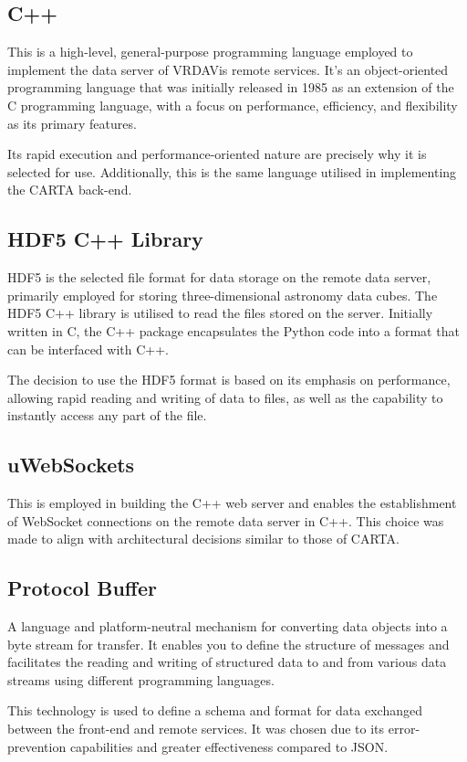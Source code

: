 \subsection{C++}
This is a high-level, general-purpose programming language employed to implement the data server of VRDAVis remote services. It's an object-oriented programming language that was initially released in 1985 as an extension of the C programming language, with a focus on performance, efficiency, and flexibility as its primary features.

Its rapid execution and performance-oriented nature are precisely why it is selected for use. Additionally, this is the same language utilised in implementing the CARTA back-end.

\subsection{HDF5 C++ Library}
HDF5 is the selected file format for data storage on the remote data server, primarily employed for storing three-dimensional astronomy data cubes. The HDF5 C++ library is utilised to read the files stored on the server. Initially written in C, the C++ package encapsulates the Python code into a format that can be interfaced with C++.

The decision to use the HDF5 format is based on its emphasis on performance, allowing rapid reading and writing of data to files, as well as the capability to instantly access any part of the file.

\subsection{uWebSockets}
This is employed in building the C++ web server and enables the establishment of WebSocket connections on the remote data server in C++. This choice was made to align with architectural decisions similar to those of CARTA.

\subsection{Protocol Buffer}
A language and platform-neutral mechanism for converting data objects into a byte stream for transfer.
It enables you to define the structure of messages and facilitates the reading and writing of structured data to and from various data streams using different programming languages.

This technology is used to define a schema and format for data exchanged between the front-end and remote services. It was chosen due to its error-prevention capabilities and greater effectiveness compared to JSON.